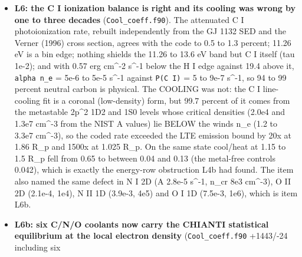 \documentclass[english,a4paper]{my_memo}
\begin{document}
\begin{itemize}
  solve became unshifted Newton (124 iterations, 1.87 -\textgreater{} 1.67; with the
  doubling off, 159 iterations, 1.87 -\textgreater{} 4.5e-2, \texttt{lam\ =\ 1} in 149 of them).
  The delivered correction (L7d) is \texttt{lam\_of\_a\_full\_step}: double at
  \texttt{lam\ \textgreater{}=\ 0.5}, otherwise multiply \texttt{dtau} by \texttt{lam}. The brief\textquotesingle s rule, double
  only at \texttt{lam\ =\ 1}, was REFUTED -\/- the near states take \texttt{lam\ =\ 0.5} steps
  and stall under it -\/- while the delivered rule leaves every near state
  bitwise identical to L4g and on the far state cuts \texttt{dtau} at the first
  damped step, so the merit falls 1.3e-1 to 5.3e-3 where the entry text froze
  it (element reload pass 1, mass 6.9e-2 to 3.2e-2). Controls across L4g:
  \texttt{carrier\_model\_a\_newton} same verdict at movement 1.8e-10,
  \texttt{atomic\_elem\_newton} certified at pass 12, \texttt{wasp\_full\_newton} 1.2e-8 and
  2.2e-8 against golden, \texttt{mol\_base\_handoff} PASS.
\item
  \textbf{L6: the C I ionization balance is right and its cooling was wrong by one
  to three decades} (\texttt{Cool\_coeff.f90}). The attenuated C I photoionization
  rate, rebuilt independently from the GJ 1132 SED and the Verner (1996)
  cross section, agrees with the code to 0.5 to 1.3 percent; 11.26 eV is a
  bin edge; nothing shields the 11.26 to 13.6 eV band but C I itself (tau
  1e-2); and with 0.57 erg cm\^{}-2 s\^{}-1 below the H I edge against 19.4 above
  it, \texttt{alpha\ n\_e} = 5e-6 to 5e-5 s\^{}-1 against \texttt{P(C\ I)} = 5 to 9e-7 s\^{}-1, so
  94 to 99 percent neutral carbon is physical. The COOLING was not: the C I
  line-cooling fit is a coronal (low-density) form, but 99.7 percent of it
  comes from the metastable 2p\^{}2 1D2 and 1S0 levels whose critical densities
  (2.0e4 and 1.3e7 cm\^{}-3 from the NIST A values) lie BELOW the wind\textquotesingle s n\_e
  (1.2 to 3.3e7 cm\^{}-3), so the coded rate exceeded the LTE emission bound by
  20x at 1.86 R\_p and 1500x at 1.025 R\_p. On the same state cool/heat at 1.15
  to 1.5 R\_p fell from 0.65 to between 0.04 and 0.13 (the metal-free
  control\textquotesingle s 0.042), which is exactly the energy-row obstruction L4b had
  found. The item also named the same defect in N I 2D (A 2.8e-5 s\^{}-1, n\_cr
  8e3 cm\^{}-3), O II 2D (2.1e-4, 1e4), N II 1D (3.9e-3, 4e5) and O I 1D
  (7.5e-3, 1e6), which is item L6b.
\item
  \textbf{L6b: six C/N/O coolants now carry the CHIANTI statistical equilibrium at
  the local electron density} (\texttt{Cool\_coeff.f90} +1443/-24 including six

\end{itemize}
\end{document}
